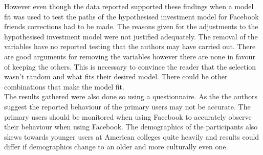 \documentclass[12pt]{article}
\begin{document}
However even though the data reported supported these findings when a model fit was used to test the paths of the hypothesised investment model for Facebook friends corrections had to be made. The reasons given for the adjustments to the hypothesised investment model were not justified adequately. The removal of the variables have no reported testing that the authors may have carried out. There are good arguments for removing the variables however there are none in favour of keeping the others. This is necessary to convince the reader that the selection wasn't random and what fits their desired model. There could be other combinations that make the model fit. \\
The results gathered were also done so using a questionnaire. As the the authors suggest the reported behaviour of the primary users may not be accurate. The primary users should be monitored when using Facebook to accurately observe their behaviour when using Facebook. The demographics of the participants also skews towards younger users at American colleges quite heavily and results could differ if demographics change to an older and more culturally even one.
\end{document}
